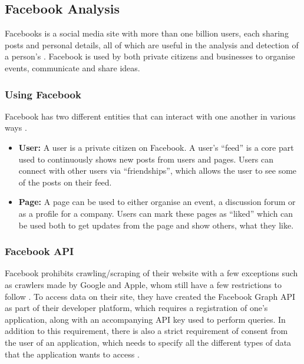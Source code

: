 \subsection{Facebook Analysis}\label{sec:facebook-analysis}
Facebooks is a social media site with more than one billion users, each sharing
posts and personal details, all of which are useful in the analysis and
detection of a person's \fbp. Facebook is used by both private citizens and
businesses to organise events, communicate and share ideas.

\subsubsection{Using Facebook}
Facebook has two different entities that can interact with one another in
various ways \Source.

\begin{itemize}
  \item \textbf{User:} A user is a private citizen on Facebook. A user's
  ``feed'' is a core part used to continuously shows new posts from users and
  pages. Users can connect with other users via ``friendships'', which allows
  the user to see some of the posts on their feed.
  \item \textbf{Page:} A page can be used to either organise an event, a
  discussion forum or as a profile for a company. Users can mark these pages as
  ``liked'' which can be used both to get updates from the page and show others,
  what they like.
\end{itemize}


\subsubsection{Facebook API}
Facebook prohibits crawling/scraping of their website with a few exceptions such
as crawlers made by Google and Apple, whom still have a few restrictions to
follow \citep{FacebookRobotsTxt}. To access data on their site, they have
created the Facebook Graph \ac{API} as part of their developer platform, which
requires a registration of one's application, along with an accompanying
\ac{API} key used to perform queries. In addition to this requirement, there is
also a strict requirement of consent from the user of an application, which
needs to specify all the different types of data that the application wants to
access \citep{FacebookGraphApiAccessTokens} \Source .\nl

